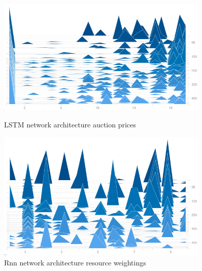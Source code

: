 \begin{figure}
    \centering
    \begin{minipage}{0.45\textwidth}
        \centering
        \includegraphics[width=0.9\textwidth]{figures/net_arch_training_fig/lstm_architecture_auction_prices.png}
        \caption{LSTM network architecture auction prices}
        \label{fig:lstm-auction-prices}
    \end{minipage}\hfill
    \begin{minipage}{0.45\textwidth}
        \centering
        \includegraphics[width=0.9\textwidth]{figures/net_arch_training_fig/lstm_architecture_weightings.png}
        \caption{Rnn network architecture resource weightings}
        \label{fig:lstm-resource-weightings}
    \end{minipage}
\end{figure}

